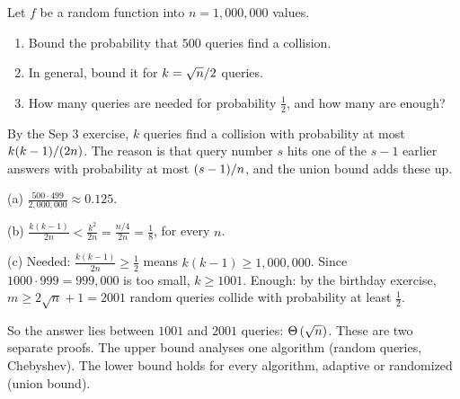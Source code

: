 \begin{exercisebox}
\begin{pproblem}\label{pp:collision-num}
    Let $f$ be a random function into $n = 1{,}000{,}000$ values.
    \begin{enumerate}[label=(\alph*)]
        \item Bound the probability that $500$ queries find a collision.
        \item In general, bound it for $k = \sqrt{n}/2$ queries.
        \item How many queries are needed for probability $\frac{1}{2}$, and how many are enough?
    \end{enumerate}
\end{pproblem}
\tcblower
\begin{wsolution}
    By the Sep 3 exercise, $k$ queries find a collision with probability at most
    $k(k-1)/(2n)$. The reason is that query number $s$ hits one of the $s - 1$ earlier
    answers with probability at most $(s-1)/n$, and the union bound adds these up.

    (a) $\frac{500 \cdot 499}{2{,}000{,}000} \approx 0.125$.

    (b) $\frac{k(k-1)}{2n} < \frac{k^2}{2n} = \frac{n/4}{2n} = \frac{1}{8}$, for every $n$.

    (c) Needed: $\frac{k(k-1)}{2n} \geq \frac{1}{2}$ means $k(k-1) \geq 1{,}000{,}000$. Since
    $1000 \cdot 999 = 999{,}000$ is too small, $k \geq 1001$. Enough: by the birthday exercise,
    $m \geq 2\sqrt{n} + 1 = 2001$ random queries collide with probability at least $\frac{1}{2}$.

    So the answer lies between $1001$ and $2001$ queries: $\Theta\left(\sqrt{n}\right)$. These are two
    separate proofs. The upper bound analyses one algorithm (random queries, Chebyshev). The lower
    bound holds for every algorithm, adaptive or randomized (union bound).
\end{wsolution}
\end{exercisebox}

